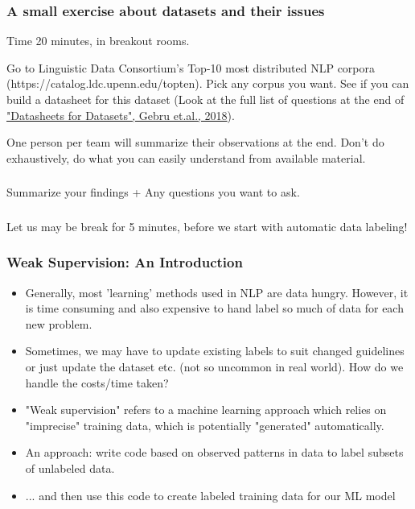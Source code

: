 \documentclass{beamer}
\begin{document}
\begin{frame}
\frametitle{A small exercise about datasets and their issues}
Time 20 minutes, in breakout rooms.

Go to Linguistic Data Consortium's Top-10 most distributed NLP corpora (https://catalog.ldc.upenn.edu/topten). Pick any corpus you want. See if you can build a datasheet for this dataset (Look at the full list of questions at the end of \href{http://www.fatml.org/media/documents/datasheets_for_datasets.pdf}{"Datasheets for Datasets", Gebru et.al., 2018}). 

One person per team will summarize their observations at the end. Don't do exhaustively, do what you can easily understand from available material. 
\end{frame}

\begin{frame}
\frametitle{}
Summarize your findings + Any questions you want to ask. 
\end{frame}

\begin{frame}
\frametitle{}
Let us may be break for 5 minutes, before we start with automatic data labeling!
\end{frame}


\begin{frame}
\frametitle{Weak Supervision: An Introduction}
\begin{itemize}
    \item Generally, most 'learning' methods used in NLP are data hungry. However, it is time consuming and also expensive to hand label so much of data for each new problem. \pause
    \item Sometimes, we may have to update existing labels to suit changed guidelines or just update the dataset etc. (not so uncommon in real world). How do we handle the costs/time taken? \pause
    \item "Weak supervision" refers to a machine learning approach which relies on "imprecise" training data, which is potentially "generated" automatically. \pause
    \item An approach: write code based on observed patterns in data to label subsets of unlabeled data.
    \item ... and then use this code to create labeled training data for our ML model
\end{itemize}
\end{frame}
\end{document}
